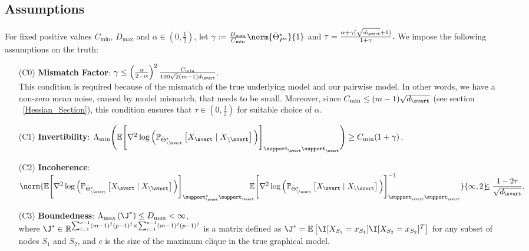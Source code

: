 \subsection{Assumptions}
For fixed positive values $C_{\min}$, $D_{\max}$ and $\alpha\in\left(0,\frac{1}{2}\right)$, let $\gamma:=\frac{D_{\max}}{C_{\min}}\norm{\bar{\Theta}^*_{P^c}}{1}$ and $\tau=\frac{\alpha+\gamma(\sqrt{d_\svert}+1)}{1+\gamma}.$ We impose the following assumptions on the truth:
\begin{itemize}
\item [(C0)] {\bf Mismatch Factor}: $\gamma\leq\left(\frac{\alpha}{2-\alpha}\right)^2\frac{C_{\min}}{100\sqrt{2}(m-1) d_\svert}$.\\

This condition is required because of the mismatch of the true underlying model and our pairwise model. In other words, we have a non-zero mean noise, caused by model mismatch, that needs to be small. Moreover, since $C_{\min}\leq (m-1)\sqrt{d_\svert}$ (see section ~\ref{Hessian_Section}), this condition ensures that $\tau\in\left(0,\frac{1}{2}\right)$ for suitable choice of $\alpha$.\\

\item [(C1)] {\bf Invertibility}: $\Lambda_{\min}\Biggr(\mathbb{E}\Bigg[\nabla^2\log\Big(\mathbb{P}_{\bar{\Theta}^*_{\backslash\svert}}\left[X_\svert\mid X_{\backslash\svert}\right]\Big)\Bigg]_{\support_\svert\support_\svert}\Biggr)\geq C_{\min}(1+\gamma)$.

\item [(C2)] {\bf Incoherence}: $\displaystyle\norm{\mathbb{E}\Bigg[\nabla^2\log\Big(\mathbb{P}_{\bar{\Theta}^*_{\backslash\svert}}\left[X_\svert\mid X_{\backslash\svert}\right]\Big)\Bigg]_{\support_\svert^c\support_\svert}\!\!\!\!\mathbb{E}\Bigg[\nabla^2\log\Big(\mathbb{P}_{\bar{\Theta}^*_{\backslash\svert}}\left[X_\svert\mid X_{\backslash\svert}\right]\Big)\Bigg]_{\support_\svert\support_\svert}^{-1}}{\infty,2}\!\!\!\!\leq \frac{1-2\tau}{\sqrt{d_\svert}}.$\\

\item [(C3)] {\bf Boundedness}: $\Lambda_{\max}\left(\J^*\right)\leq D_{\max}<\infty$,\\

 where $\J^*\in\mathbb{R}^{\sum_{i=1}^{c-1}(m-1)^j(p-1)^j\times\sum_{i=1}^{c-1}(m-1)^j(p-1)^j}$ is a matrix defined as $\J^*=\mathbb{E}\left[\I[X_{S_1}=x_{S_1}]\I[X_{S_2}=x_{S_2}]^T\right]$ for any subset of nodes $S_1$ and $S_2$, and $c$ is the size of the maximum clique in the true graphical model.
\end{itemize} 

